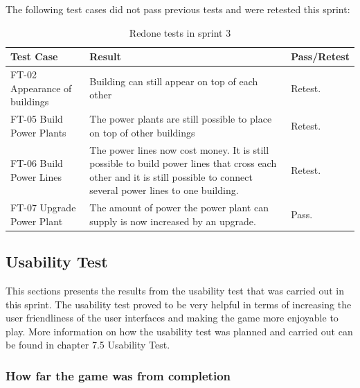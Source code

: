 	The following test cases did not pass previous tests and were retested this sprint:

	\begin{table}
	\begin{tabular}{| p{3cm} | p{6.5cm} | p{2.5cm} |}
		\hline
		\rowcolor{lightgray}
		{\bf Test Case} & {\bf Result} & {\bf Pass/Retest} \\ \hline

		FT-02 Appearance of buildings & Building can still appear on top of each other & Retest. \\ \hline

	  	FT-05 Build Power Plants & The power plants are still possible to place on top of other buildings & Retest. \\ \hline

	  	FT-06 Build Power Lines & The power lines now cost money. It is still possible to build power lines that cross each other and it is still possible to connect several power lines to one building. & Retest. \\ \hline

	  	FT-07 Upgrade Power Plant & The amount of power the power plant can supply is now increased by an upgrade. & Pass. \\ \hline
	\end{tabular}
	\caption{Redone tests in sprint 3}
	\end{table}

\subsection{Usability Test}

	This sections presents the results from the usability test that was carried out in this sprint. The usability test proved to be very helpful in terms of increasing the user friendliness of the user interfaces and making the game more enjoyable to play. More information on how the usability test was planned and carried out can be found in chapter 7.5 Usability Test.

	\subsubsection*{How far the game was from completion}

